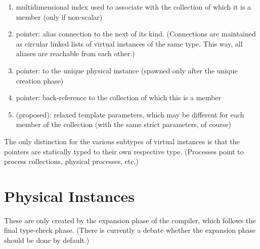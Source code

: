 \begin{enumerate}
\item multidimensional index used to associate with the collection
	of which it is a member (only if non-scalar)
\item pointer: alias connection to the next of its kind.
	(Connections are maintained as circular linked lists
	of virtual instances of the same type.  
	This way, all aliases are reachable from each other.)
\item pointer: to the unique physical instance 
	(spawned only after the unique creation phase)
\item pointer: back-reference to the collection of which this is a member
\item (proposed): relaxed template parameters, 
	which may be different for each member of the collection
	(with the same strict parameters, of course)
\end{enumerate}

The only distinction for the various subtypes of virtual instances is that
the pointers are statically typed to their own respective type.
(Processes point to process collections, physical processes, etc.)

\begin{comment}
\subsection{Process VI}
\label{sec:instance:virtual:proc}

\subsection{Channel VI}
\label{sec:instance:virtual:chan}

\subsection{Data VI}
\label{sec:instance:virtual:data}
\end{comment}

\section{Physical Instances}
\label{sec:instance:physical}

These are only created by the expansion phase of the compiler, 
which follows the final type-check phase.  
(There is currently a debate whether the expansion phase should
be done by default.)  

